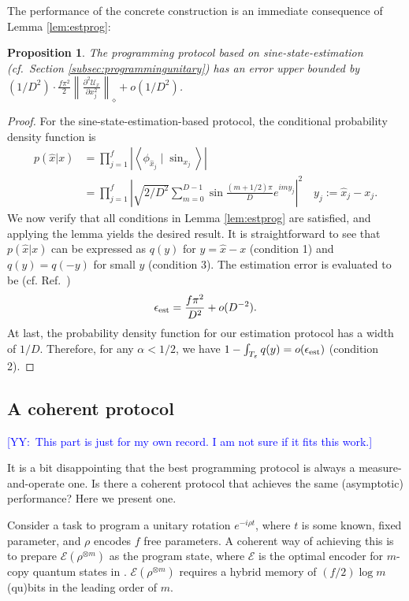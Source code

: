 \documentclass[11pt,letterpaper]{article}
\newtheorem{prop}{Proposition}
\newcommand{\braket}[2]{\left\langle #1 \mid #2 \right\rangle}
\def\eps{\varepsilon}
\def\map{\mathcal}
\newcommand{\YY}[1]{\textcolor{blue}{[YY:\ #1]}}
\begin{document}
The performance of the concrete construction is an immediate consequence of Lemma \ref{lem:estprog}:
\begin{prop}
    The programming protocol based on sine-state-estimation (cf.~Section \ref{subsec:programmingunitary}) has an error upper bounded by $(1/D^2)\cdot\frac {f\pi^2}2\left\|\frac{\partial^2\map{U}_x}{\partial x_{j}^2}\right\|_{\diamond}+o(1/D^2)$.
\end{prop}
\begin{proof}
    For the sine-state-estimation-based protocol, the conditional probability density function is  
    \begin{align}      p(\hat{x}|x)&=\prod_{j=1}^f\left|\braket{\phi_{\hat{x}_j}}{\sin_{x_j}}\right|\\        &=\prod_{j=1}^f\left|\sqrt{2/D^2}\sum_{m=0}^{D-1}\sin\frac{(m+1/2)\pi}{D}e^{imy_j}\right|^2\quad y_j:=\hat{x}_j-x_j.
    \end{align}
    We now verify that all conditions in Lemma \ref{lem:estprog} are satisfied, and applying the lemma yields the desired result.
    It is straightforward to see that $p(\hat{x}|x)$ can be expressed as $q(y)$ for $y=\hat{x}-x$ (condition 1) and $q(y)=q(-y)$ for small $y$ (condition 3). The estimation error is evaluated to be (cf. Ref.~\cite{buvzek1999optimal}) 
    \begin{align}
        \epsilon_{\rm est}=\frac{f\pi^2}{D^2}+o(D^{-2}).
    \end{align} 
    At last, the probability density function for our estimation protocol has a width of $1/D$. Therefore, for any $\alpha<1/2$, we have $1-\int_{T_\eps}q(y)=o(\epsilon_{\rm est})$ (condition 2). 
\end{proof}

\subsection{A coherent protocol}
\YY{This part is just for my own record. I am not sure if it fits this work.}

It is a bit disappointing that the best programming protocol is always a measure-and-operate one. Is there a coherent protocol that achieves the same (asymptotic) performance? Here we present one.

Consider a task to program a unitary rotation $e^{-i\rho t}$, where $t$ is some known, fixed parameter, and $\rho$ encodes $f$ free parameters. A coherent way of achieving this is to prepare $\mathcal{E}(\rho^{\otimes m})$ as the program state, where $\mathcal{E}$ is the optimal encoder for $m$-copy quantum states in \cite{yang2018compression}. $\mathcal{E}(\rho^{\otimes m})$ requires a hybrid memory of $(f/2)\log m$ (qu)bits in the leading order of $m$.
\end{document}
